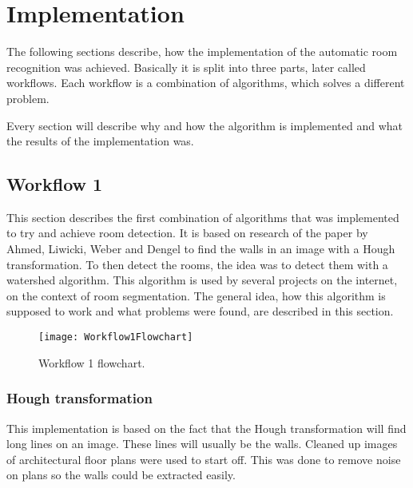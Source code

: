\section{Implementation}
\label{sub:Implemenation}
The following sections describe, how the implementation of the automatic room recognition was achieved. Basically it is split into three parts, later called workflows. Each workflow is a combination of algorithms, which solves a different problem.

Every section will describe why and how the algorithm is implemented and what the results of the implementation was.

\subsection{Workflow 1}
\label{sub:workflow1}
This section describes the first combination of algorithms that was implemented to try and achieve room detection. It is based on research of the paper by Ahmed, Liwicki, Weber and Dengel \citep{mace_valveny_loctea_tabbone_2010} to find the walls in an image with a Hough transformation. To then detect the rooms, the idea was to detect them with a watershed algorithm. This algorithm is used by several projects on the internet, on the context of room segmentation. The general idea, how this algorithm is supposed to work and what problems were found, are described in this section.

\begin{figure}[H]
	\centering
	\texttt{[image: Workflow1Flowchart]}
	\caption{Workflow 1 flowchart.}
	\label{fig:Workflow1Flowchart}
\end{figure}

\subsubsection{Hough transformation}
This implementation is based on the fact that the Hough transformation will find long lines on an image. These lines will usually be the walls. Cleaned up images of architectural floor plans were used to start off. This was done to remove noise on plans so the walls could be extracted easily.

